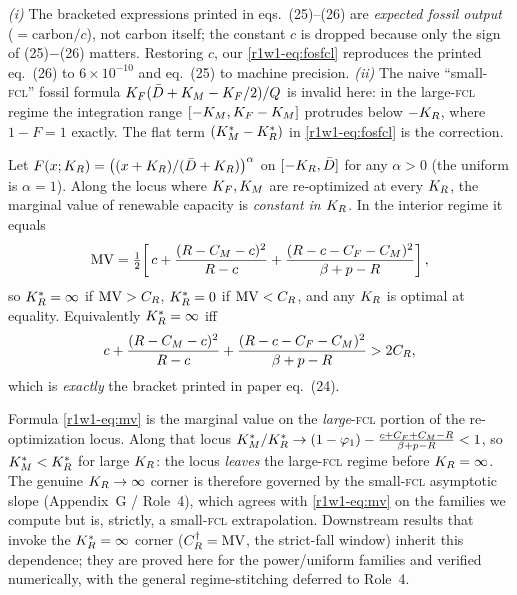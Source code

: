 \begin{remark}\label{r1w1-rem:corr}
\emph{(i)} The bracketed expressions printed in eqs.\ (25)--(26) are
\emph{expected fossil output} ($=\text{carbon}/c$), not carbon itself; the
constant $c$ is dropped because only the sign of (25)$-$(26) matters. Restoring
$c$, our \eqref{r1w1-eq:fosfcl} reproduces the printed eq.\ (26) to $6\times10^{-10}$
and eq.\ (25) to machine precision.
\emph{(ii)} The naive ``small-\textsc{fcl}'' fossil formula
$K_F(\bar D+K_M-K_F/2)/Q$ is invalid here: in the large-\textsc{fcl} regime the
integration range $[-K_M,K_F-K_M]$ protrudes below $-K_R$, where $1-F=1$
exactly. The flat term $(K_M^{*}-K_R^{*})$ in \eqref{r1w1-eq:fosfcl} is the correction.
\end{remark}

\begin{proposition}\label{r1w1-prop:knife}
Let $F(x;K_R)=\big((x+K_R)/(\bar D+K_R)\big)^{\alpha}$ on $[-K_R,\bar D]$ for any
$\alpha>0$ (the uniform is $\alpha=1$). Along the locus where $K_F,K_M$ are
re-optimized at every $K_R$, the marginal value of renewable capacity is
\emph{constant in $K_R$}. In the interior regime it equals
\begin{equation}\label{r1w1-eq:mv}
  \mathrm{MV}=\tfrac12\!\left[\,c
  +\frac{(R-C_M-c)^2}{R-c}
  +\frac{(R-c-C_F-C_M)^2}{\beta+p-R}\right],
\end{equation}
so $\KRs=\infty$ if $\mathrm{MV}>C_R$, $K_R^{*}=0$ if $\mathrm{MV}<C_R$, and any
$K_R$ is optimal at equality. Equivalently $\KRs=\infty$ iff
\begin{equation}\label{r1w1-eq:eq24}
  c+\frac{(R-C_M-c)^2}{R-c}+\frac{(R-c-C_F-C_M)^2}{\beta+p-R}>2C_R ,
\end{equation}
which is \emph{exactly} the bracket printed in paper eq.\ (24).
\end{proposition}

\begin{remark}[The $\KRs=\infty$ corner is a small-\textsc{fcl} statement]\label{r1w1-rem:knifecaveat}
Formula \eqref{r1w1-eq:mv} is the marginal value on the \emph{large}-\textsc{fcl} portion of
the re-optimization locus. Along that locus $K_M^{*}/K_R^{*}\to(1-\varphi_1)-\tfrac{c+C_F+C_M-R}{\beta+p-R}<1$,
so $K_M^{*}<K_R^{*}$ for large $K_R$: the locus \emph{leaves} the large-\textsc{fcl} regime before
$K_R=\infty$. The genuine $K_R\to\infty$ corner is therefore governed by the
small-\textsc{fcl} asymptotic slope (Appendix~G / Role~4), which agrees with \eqref{r1w1-eq:mv}
on the families we compute but is, strictly, a small-\textsc{fcl} extrapolation. Downstream
results that invoke the $\KRs=\infty$ corner ($C_R^{\dagger}=\mathrm{MV}$, the strict-fall
window) inherit this dependence; they are proved here for the power/uniform families and
verified numerically, with the general regime-stitching deferred to Role~4.
\end{remark}

